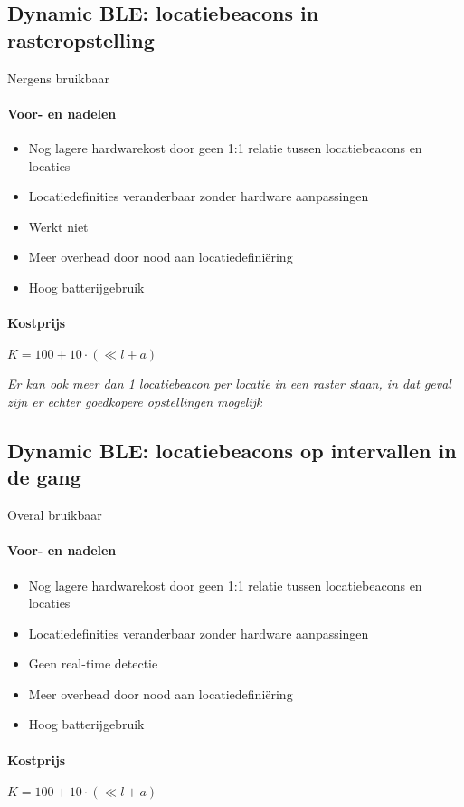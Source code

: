 \subsection{Dynamic BLE: locatiebeacons in rasteropstelling}
Nergens bruikbaar
\paragraph{Voor- en nadelen}
\begin{itemize}
	\color{ForestGreen}
	\item Nog lagere hardwarekost door geen 1:1 relatie tussen locatiebeacons en locaties
	\item Locatiedefinities veranderbaar zonder hardware aanpassingen
	\color{RedOrange}
	\item Werkt niet
	\item Meer overhead door nood aan locatiedefiniëring
	\item Hoog batterijgebruik
\end{itemize}
\paragraph{Kostprijs}
\(K = 100 + 10 \cdot (\ll l + a)\)

\emph{Er kan ook meer dan 1 locatiebeacon per locatie in een raster staan, in dat geval zijn er echter goedkopere opstellingen mogelijk}

\subsection{Dynamic BLE: locatiebeacons op intervallen in de gang}
Overal bruikbaar
\paragraph{Voor- en nadelen}
\begin{itemize}
	\color{ForestGreen}
	\item Nog lagere hardwarekost door geen 1:1 relatie tussen locatiebeacons en locaties
	\item Locatiedefinities veranderbaar zonder hardware aanpassingen
	\color{RedOrange}
	\item Geen real-time detectie
	\item Meer overhead door nood aan locatiedefiniëring
	\item Hoog batterijgebruik
\end{itemize}
\paragraph{Kostprijs}
\(K = 100 + 10 \cdot (\ll l + a)\)

